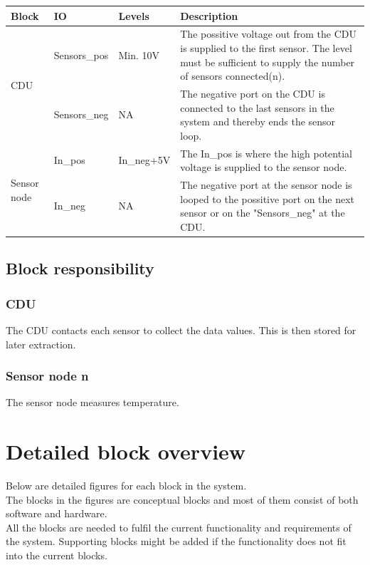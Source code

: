 \begin{table}[H]
\begin{center}
\begin{tabular}{ p{2.5cm} p{2cm} p{2cm} p{7cm} }
\hline
\textbf{Block} & \textbf{IO} & \textbf{Levels} & \textbf{Description} \\\hline
\multirow{2}{2.5cm}[-3.5em]{CDU} & Sensors\_pos & Min. 10V & The possitive voltage out from the CDU is supplied to the first sensor. The level must be sufficient to supply the number of sensors connected(n).\\ \cline{2-4}
 & Sensors\_neg & NA & The negative port on the CDU is connected to the last sensors in the system and thereby ends the sensor loop. \\ \hline
\multirow{2}{2.5cm}[-3em]{Sensor node} & In\_pos & In\_neg+5V &The In\_pos is where the high potential voltage is supplied to the sensor node. \\ \cline{2-4}
& In\_neg & NA & The negative port at the sensor node is looped to the possitive port on the next sensor or on the "Sensors\_neg" at the CDU. \\ \hline
\end{tabular}
\end{center}
\end{table}

\subsection{Block responsibility}
\subsubsection{CDU}
The CDU contacts each sensor to collect the data values. This is then stored for later extraction.

\subsubsection{Sensor node n}
The sensor node measures temperature.

\section{Detailed block overview}
Below are detailed figures for each block in the system.\\
The blocks in the figures are conceptual blocks and most of them consist of both software and hardware.\\
All the blocks are needed to fulfil the current functionality and requirements of the system. Supporting blocks might be added if the functionality does not fit into the current blocks.

